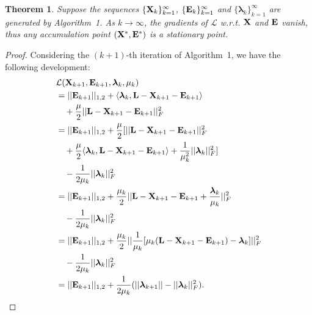 \documentclass[letterpaper]{article} %
\newtheorem{theorem}{Theorem}
\def\bE{{\bf E}}
\def\blambda{{\bm \lambda}}
\def\calL{{\mathcal{L}}}
\def\bL{{\bf L}}
\def\bX{{\bf X}}
\def\bX{{\bf X}}
\begin{document}
\begin{theorem}
\label{theorem:alm_convergence}
  Suppose the sequences $\{\bX_k\}_{k=1}^{\infty}$, $\{\bE_k\}_{k=1}^{\infty}$ and $\{\blambda_k\}_{k=1}^{\infty}$ are generated by Algorithm~1.
  As $k \to \infty$, the gradients of $\calL$ w.r.t. $\bX$ and $\bE$ vanish,
  thus any accumulation point $(\bX^*, \bE^*)$ is a stationary point.
\end{theorem}


\begin{proof}
    Considering the $(k+1)$-th iteration of Algorithm~1, we have the following development:
    \begin{align}
    \label{eq:proof1}
      & \calL(\bX_{k+1}, \bE_{k+1}, \blambda_{k}, \mu_{k})   \nonumber \\
      & = || \bE_{k+1} ||_{1,2} + \langle \blambda_{k}, \bL - \bX_{k+1} - \bE_{k+1} \rangle  \nonumber \\
      & \quad + \frac{\mu}{2} || \bL - \bX_{k+1} - \bE_{k+1} ||_{F}^2         \nonumber \\
      & = || \bE_{k+1} ||_{1,2} + \frac{\mu}{2} [ || \bL - \bX_{k+1} - \bE_{k+1} ||_{F}^2  \nonumber \\
      & \quad + \frac{\mu}{2} \langle \blambda_{k}, \bL - \bX_{k+1} - \bE_{k+1} \rangle + \frac{1}{\mu_{k}^2} || \blambda_k ||_F^2 ] \nonumber \\
      & \quad - \frac{1}{2\mu_k} || \blambda_k ||_F^2    \nonumber  \\
      & = || \bE_{k+1} ||_{1,2} + \frac{\mu_k}{2} || \bL - \bX_{k+1} - \bE_{k+1} + \frac{\blambda_k}{\mu_k} ||_F^2 \nonumber \\
      & \quad - \frac{1}{2\mu_k} || \blambda_k ||_F^2   \nonumber \\
      & = || \bE_{k+1} ||_{1,2} + \frac{\mu_k}{2} || \frac{1}{\mu_k} [ \mu_k (\bL - \bX_{k+1} - \bE_{k+1}) - \blambda_k ] ||_F^2  \nonumber \\
      & \quad - \frac{1}{2\mu_k} || \blambda_k ||_F^2   \nonumber \\
      & = || \bE_{k+1} ||_{1,2} + \frac{1}{2\mu_k} ( || \blambda_{k+1} || - || \blambda_{k} ||_F^2 )   .

\end{align}
\end{proof}
\end{document}
